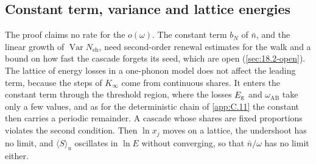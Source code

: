 \subsection{Constant term, variance and lattice energies}

The proof claims no rate for the $o(\omega)$. The constant term $b_N$ of $\bar n$, and the linear growth of $\operatorname{Var}N_{\mathrm{eh}}$, need second-order renewal estimates for the walk and a bound on how fast the cascade forgets its seed, which are open (\cref{sec:18.2-open}). The lattice of energy losses in a one-phonon model does not affect the leading term, because the steps of $K_\infty$ come from continuous shares. It enters the constant term through the threshold region, where the losses $E_{\mathrm{g}}$ and $\omega_{\mathrm{AB}}$ take only a few values, and as for the deterministic chain of \cref{app:C.11} the constant then carries a periodic remainder. A cascade whose shares are fixed proportions violates the second condition. Then $\ln x_j$ moves on a lattice, the undershoot has no limit, and $\langle S\rangle_u$ oscillates in $\ln E$ without converging, so that $\bar n/\omega$ has no limit either.

